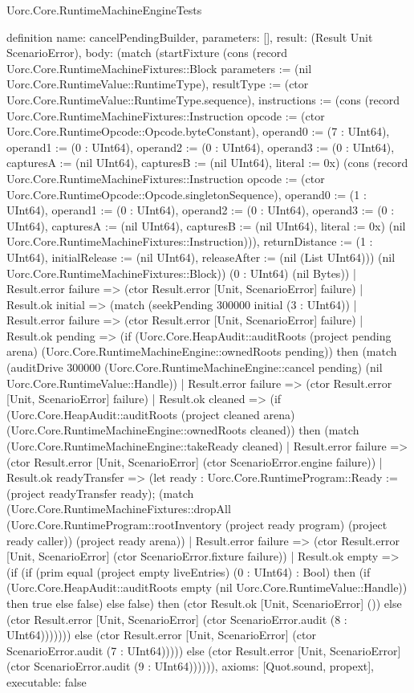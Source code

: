 \begin{lexlean}{Uorc.Core.RuntimeMachineEngineTests}
\begin{semanticmodule}
definition{
  name: cancelPendingBuilder,
  parameters: [],
  result: (Result Unit ScenarioError),
  body: (match (startFixture (cons (record Uorc.Core.RuntimeMachineFixtures::Block {parameters := (nil Uorc.Core.RuntimeValue::RuntimeType), resultType := (ctor Uorc.Core.RuntimeValue::RuntimeType.sequence), instructions := (cons (record Uorc.Core.RuntimeMachineFixtures::Instruction {opcode := (ctor Uorc.Core.RuntimeOpcode::Opcode.byteConstant), operand0 := (7 : UInt64), operand1 := (0 : UInt64), operand2 := (0 : UInt64), operand3 := (0 : UInt64), capturesA := (nil UInt64), capturesB := (nil UInt64), literal := 0x}) (cons (record Uorc.Core.RuntimeMachineFixtures::Instruction {opcode := (ctor Uorc.Core.RuntimeOpcode::Opcode.singletonSequence), operand0 := (1 : UInt64), operand1 := (0 : UInt64), operand2 := (0 : UInt64), operand3 := (0 : UInt64), capturesA := (nil UInt64), capturesB := (nil UInt64), literal := 0x}) (nil Uorc.Core.RuntimeMachineFixtures::Instruction))), returnDistance := (1 : UInt64), initialRelease := (nil UInt64), releaseAfter := (nil (List UInt64))}) (nil Uorc.Core.RuntimeMachineFixtures::Block)) (0 : UInt64) (nil Bytes))
    | Result.error failure => (ctor Result.error [Unit, ScenarioError] failure)
    | Result.ok initial => (match (seekPending 300000 initial (3 : UInt64))
      | Result.error failure => (ctor Result.error [Unit, ScenarioError] failure)
      | Result.ok pending => (if (Uorc.Core.HeapAudit::auditRoots (project pending arena) (Uorc.Core.RuntimeMachineEngine::ownedRoots pending)) then (match (auditDrive 300000 (Uorc.Core.RuntimeMachineEngine::cancel pending) (nil Uorc.Core.RuntimeValue::Handle))
        | Result.error failure => (ctor Result.error [Unit, ScenarioError] failure)
        | Result.ok cleaned => (if (Uorc.Core.HeapAudit::auditRoots (project cleaned arena) (Uorc.Core.RuntimeMachineEngine::ownedRoots cleaned)) then (match (Uorc.Core.RuntimeMachineEngine::takeReady cleaned)
          | Result.error failure => (ctor Result.error [Unit, ScenarioError] (ctor ScenarioError.engine failure))
          | Result.ok readyTransfer => (let ready : Uorc.Core.RuntimeProgram::Ready := (project readyTransfer ready); (match (Uorc.Core.RuntimeMachineFixtures::dropAll (Uorc.Core.RuntimeProgram::rootInventory (project ready program) (project ready caller)) (project ready arena))
            | Result.error failure => (ctor Result.error [Unit, ScenarioError] (ctor ScenarioError.fixture failure))
            | Result.ok empty => (if (if (prim equal (project empty liveEntries) (0 : UInt64) : Bool) then (if (Uorc.Core.HeapAudit::auditRoots empty (nil Uorc.Core.RuntimeValue::Handle)) then true else false) else false) then (ctor Result.ok [Unit, ScenarioError] ()) else (ctor Result.error [Unit, ScenarioError] (ctor ScenarioError.audit (8 : UInt64))))))) else (ctor Result.error [Unit, ScenarioError] (ctor ScenarioError.audit (7 : UInt64))))) else (ctor Result.error [Unit, ScenarioError] (ctor ScenarioError.audit (9 : UInt64)))))),
  axioms: [Quot.sound, propext],
  executable: false
}


\end{semanticmodule}
\end{lexlean}
